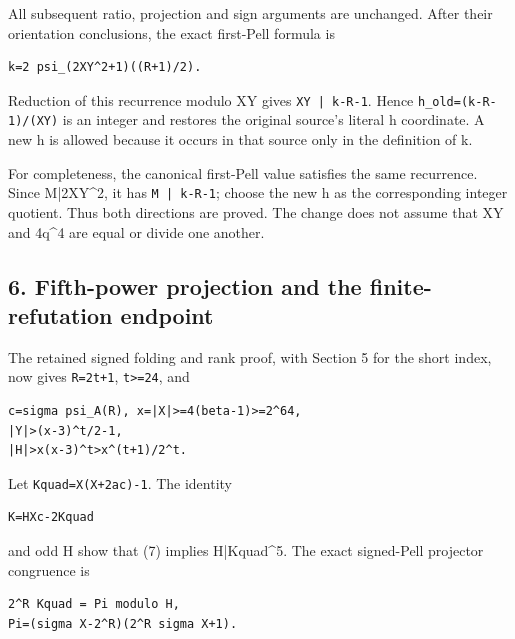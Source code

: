 All subsequent ratio, projection and sign arguments are unchanged. After their orientation conclusions, the exact first-Pell formula is



\begin{verbatim}
k=2 psi_(2XY^2+1)((R+1)/2).
\end{verbatim}

Reduction of this recurrence modulo XY gives \texttt{XY | k-R-1}. Hence \texttt{h\_\allowbreak{}old=\allowbreak{}(k-R-1)/\allowbreak{}(XY)} is an integer and restores the original source's literal h coordinate. A new h is allowed because it occurs in that source only in the definition of k.



For completeness, the canonical first-Pell value satisfies the same recurrence. Since M|2XY\textasciicircum{}\allowbreak{}2, it has \texttt{M | k-R-1}; choose the new h as the corresponding integer quotient. Thus both directions are proved. The change does not assume that XY and 4q\textasciicircum{}\allowbreak{}4 are equal or divide one another.



\subsection{6. Fifth-power projection and the finite-refutation endpoint}



The retained signed folding and rank proof, with Section 5 for the short index, now gives \texttt{R=\allowbreak{}2t+\allowbreak{}1}, \texttt{t\textgreater{}\allowbreak{}=\allowbreak{}24}, and



\begin{verbatim}
c=sigma psi_A(R), x=|X|>=4(beta-1)>=2^64,
|Y|>(x-3)^t/2-1,
|H|>x(x-3)^t>x^(t+1)/2^t.
\end{verbatim}

Let \texttt{Kquad=\allowbreak{}X(X+\allowbreak{}2ac)-1}. The identity



\begin{verbatim}
K=HXc-2Kquad
\end{verbatim}

and odd H show that (7) implies H|Kquad\textasciicircum{}\allowbreak{}5. The exact signed-Pell projector congruence is



\begin{verbatim}
2^R Kquad = Pi modulo H,
Pi=(sigma X-2^R)(2^R sigma X+1).
\end{verbatim}

